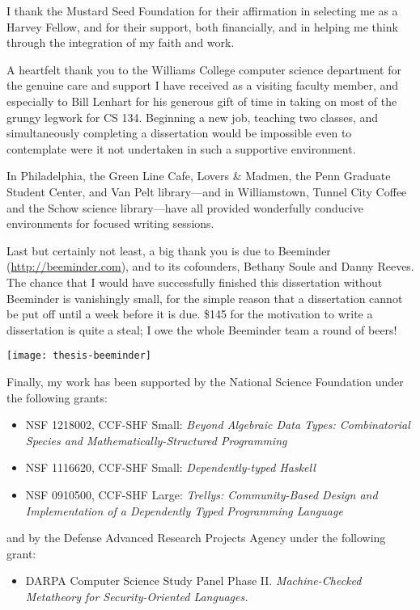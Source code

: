 I thank the Mustard Seed Foundation for their affirmation in selecting
me as a Harvey Fellow, and for their support, both financially, and in
helping me think through the integration of my faith and work.

A heartfelt thank you to the Williams College computer science
department for the genuine care and support I have received as a
visiting faculty member, and especially to Bill Lenhart for his
generous gift of time in taking on most of the grungy legwork for CS
134.  Beginning a new job, teaching two classes, and simultaneously
completing a dissertation would be impossible even to contemplate were
it not undertaken in such a supportive environment.

In Philadelphia, the Green Line Cafe, Lovers \& Madmen, the Penn
Graduate Student Center, and Van Pelt library---and in Williamstown,
Tunnel City Coffee and the Schow science library---have all provided
wonderfully conducive environments for focused writing sessions.

Last but certainly not least, a big thank you is due to Beeminder
(\url{http://beeminder.com}), and to its cofounders, Bethany Soule and
Danny Reeves.  The chance that I would have successfully finished this
dissertation without Beeminder is vanishingly small, for the simple
reason that a dissertation cannot be put off until a week before it is
due.  \$145 for the motivation to write a dissertation is quite a
steal; I owe the whole Beeminder team a round of beers!

\begin{center}
  \texttt{[image: thesis-beeminder]}
\end{center}

\begingroup
\small Finally, my work has been supported by the National Science
Foundation under the following grants:
\begin{itemize}
\item NSF 1218002, CCF-SHF Small: \emph{Beyond Algebraic Data Types:
  Combinatorial Species and Mathematically-Structured Programming}
\item NSF 1116620, CCF-SHF Small: \emph{Dependently-typed Haskell}
\item NSF 0910500, CCF-SHF Large: \emph{Trellys: Community-Based
    Design and Implementation of a Dependently Typed Programming
    Language}
\end{itemize}
and by the Defense Advanced Research Projects Agency under the
following grant:
\begin{itemize}
\item DARPA Computer Science Study Panel Phase
  II. \emph{Machine-Checked Metatheory for Security-Oriented
    Languages.}
\end{itemize}
\endgroup

